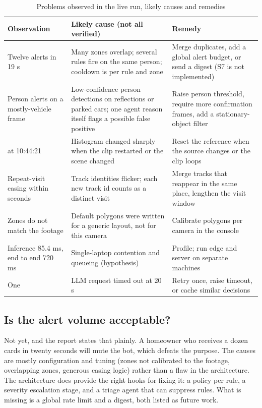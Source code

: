 \documentclass[11pt]{article}
\DeclareRobustCommand{\code}[1]{\texttt{\detokenize{#1}}}
\begin{document}
\begin{table}[H]
\centering\small
\caption{Problems observed in the live run, likely causes and remedies}
\label{tab:ieee_30}
\begin{tabularx}{\textwidth}{|L{3.4cm}|Y|Y|}
\hline
{} \textbf{Observation} & \textbf{Likely cause (not all verified)} & \textbf{Remedy} \\ \hline
Twelve alerts in 19 s & Many zones overlap; several rules fire on the same person; cooldown is per rule and zone & Merge duplicates, add a global alert budget, or send a digest (S7 is not implemented) \\ \hline
Person alerts on a mostly-vehicle frame & Low-confidence person detections on reflections or parked cars; one agent reason itself flags a possible false positive & Raise person threshold, require more confirmation frames, add a stationary-object filter \\ \hline
\code{Camera Tamper Moved} at 10:44:21 & Histogram changed sharply when the clip restarted or the scene changed & Reset the reference when the source changes or the clip loops \\ \hline
Repeat-visit casing within seconds & Track identities flicker; each new track id counts as a distinct visit & Merge tracks that reappear in the same place, lengthen the visit window \\ \hline
Zones do not match the footage & Default polygons were written for a generic layout, not for this camera & Calibrate polygons per camera in the console \\ \hline
Inference 85.4 ms, end to end 720 ms & Single-laptop contention and queueing (hypothesis) & Profile; run edge and server on separate machines \\ \hline
One \code{fail-open} & LLM request timed out at 20 s & Retry once, raise timeout, or cache similar decisions \\ \hline
\end{tabularx}
\end{table}

\subsection{Is the alert volume acceptable?}

Not yet, and the report states that plainly. A homeowner who receives a dozen cards in twenty seconds will mute the bot, which defeats the purpose. The causes are mostly configuration and tuning (zones not calibrated to the footage, overlapping zones, generous casing logic) rather than a flaw in the architecture. The architecture does provide the right hooks for fixing it: a policy per rule, a severity escalation stage, and a triage agent that can suppress \code{review} rules. What is missing is a global rate limit and a digest, both listed as future work.
\end{document}
